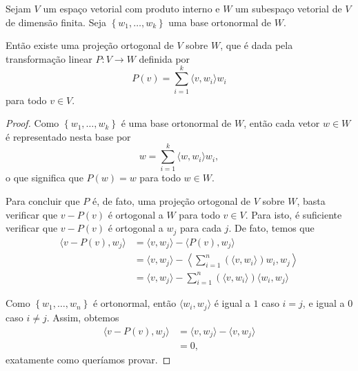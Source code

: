 \begin{theorem}
	Sejam $V$ um espaço vetorial com produto interno e $W$ um subespaço vetorial de $V$ de dimensão finita. Seja $\left\{w_1,\ldots,w_k\right\}$ uma base ortonormal de $W$.
	
	Então existe uma projeção ortogonal de $V$ sobre $W$, que é dada pela transformação linear $P\colon V\to W$ definida por
	\[P(v)=\sum_{i=1}^k\langle v,w_i\rangle w_i\]
	para todo $v\in V$.
\end{theorem}

\begin{proof}
	Como $\left\{w_1,\ldots,w_k\right\}$ é uma base ortonormal de $W$, então cada vetor $w\in W$ é representado nesta base por
	\[w=\sum_{i=1}^k\langle w,w_i\rangle w_i,\]
	o que significa que $P(w)=w$ para todo $w\in W$.
	
	Para concluir que $P$ é, de fato, uma projeção ortogonal de $V$ sobre $W$, basta verificar que $v-P(v)$ é ortogonal a $W$ para todo $v\in V$. Para isto, é suficiente verificar que $v-P(v)$ é ortogonal a $w_j$ para cada $j$. De fato, temos que
	\begin{align*}
	\langle v-P(v),w_j\rangle
		&=\langle v,w_j\rangle-\langle P(v),w_j\rangle\\
		&=\langle v,w_j\rangle-\left\langle\sum_{i=1}^n(\langle v,w_i\rangle) w_i,w_j\right\rangle\\
		&=\langle v,w_j\rangle-\sum_{i=1}^n(\langle v,w_i\rangle)\langle w_i,w_j\rangle
	\end{align*}
	
	Como $\left\{w_1,\ldots,w_n\right\}$ é ortonormal, então $\langle w_i,w_j\rangle$ é igual a $1$ caso $i=j$, e igual a $0$ caso $i\neq j$. Assim, obtemos
	\begin{align*}
	\langle v-P(v),w_j\rangle
		&=\langle v,w_j\rangle-\langle v,w_j\rangle\\
		&=0,
	\end{align*}
	exatamente como queríamos provar.
\end{proof}